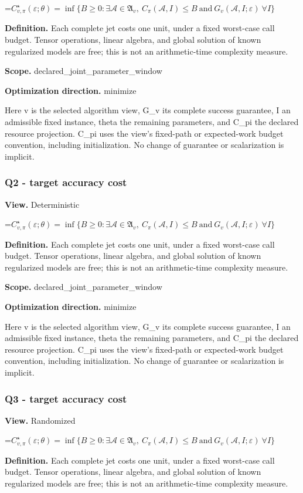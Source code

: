 \documentclass[10pt,a4paper]{article}
\newcommand{\AtlasMath}[1]{\par\begingroup\centering\setbox0=\hbox{$\displaystyle #1$}\ifdim\wd0>1.4\linewidth\typeout{ATLAS WIDE FORMULA: \the\wd0}\fi\ifdim\wd0>\linewidth\resizebox{\linewidth}{!}{\box0}\else\box0\fi\par\endgroup}
\begin{document}
\AtlasMath{C^\star_{v,\pi}(\varepsilon;\theta)=\inf\{B\ge0:\exists\mathcal A\in\mathfrak A_v,\ C_\pi(\mathcal A,I)\le B\ \text{and}\ G_v(\mathcal A,I;\varepsilon)\ \forall I\}}
\textbf{Definition.} Each complete jet costs one unit, under a fixed worst-case call budget. Tensor operations, linear algebra, and global solution of known regularized models are free; this is not an arithmetic-time complexity measure.

\textbf{Scope.} declared\_joint\_parameter\_window

\textbf{Optimization direction.} minimize

Here v is the selected algorithm view, G\_v its complete success guarantee, I an admissible fixed instance, theta the remaining parameters, and C\_pi the declared resource projection. C\_pi uses the view's fixed-path or expected-work budget convention, including initialization. No change of guarantee or scalarization is implicit.

\subsubsection{Q2 - target accuracy cost}
\textbf{View.} Deterministic

\AtlasMath{C^\star_{v,\pi}(\varepsilon;\theta)=\inf\{B\ge0:\exists\mathcal A\in\mathfrak A_v,\ C_\pi(\mathcal A,I)\le B\ \text{and}\ G_v(\mathcal A,I;\varepsilon)\ \forall I\}}
\textbf{Definition.} Each complete jet costs one unit, under a fixed worst-case call budget. Tensor operations, linear algebra, and global solution of known regularized models are free; this is not an arithmetic-time complexity measure.

\textbf{Scope.} declared\_joint\_parameter\_window

\textbf{Optimization direction.} minimize

Here v is the selected algorithm view, G\_v its complete success guarantee, I an admissible fixed instance, theta the remaining parameters, and C\_pi the declared resource projection. C\_pi uses the view's fixed-path or expected-work budget convention, including initialization. No change of guarantee or scalarization is implicit.

\subsubsection{Q3 - target accuracy cost}
\textbf{View.} Randomized

\AtlasMath{C^\star_{v,\pi}(\varepsilon;\theta)=\inf\{B\ge0:\exists\mathcal A\in\mathfrak A_v,\ C_\pi(\mathcal A,I)\le B\ \text{and}\ G_v(\mathcal A,I;\varepsilon)\ \forall I\}}
\textbf{Definition.} Each complete jet costs one unit, under a fixed worst-case call budget. Tensor operations, linear algebra, and global solution of known regularized models are free; this is not an arithmetic-time complexity measure.
\end{document}
